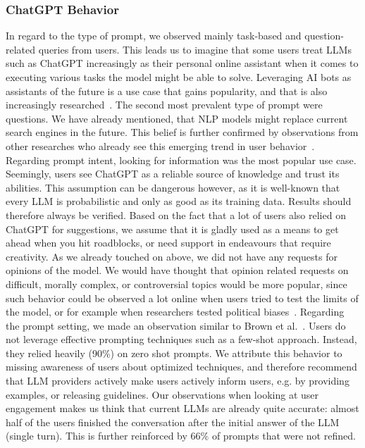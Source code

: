 \subsubsection{ChatGPT Behavior}
In regard to the type of prompt, we observed mainly task-based and question-related queries from
users.
This leads us to imagine that some users treat LLMs such as ChatGPT increasingly as their
personal online assistant when it comes to executing various tasks the model might be able to solve.
Leveraging AI bots as assistants of the future is a use case that gains popularity, and that is also
increasingly researched~\cite{eshghie_chatgpt_2023}.
The second most prevalent type of prompt were questions.
We have already mentioned, that NLP models might replace current search engines in the future.
This belief is further confirmed by observations from other researches who already see this
emerging trend in user behavior~\cite{van_bulck_what_2023}.
Regarding prompt intent, looking for information was the most popular use case.
Seemingly, users see ChatGPT as a reliable source of knowledge and trust its abilities.
This assumption can be dangerous however, as it is well-known that every LLM is probabilistic and
only as good as its training data.
Results should therefore always be verified.
Based on the fact that a lot of users also relied on ChatGPT for suggestions, we assume that it
is gladly used as a means to get ahead when you hit roadblocks, or need support in endeavours
that require creativity.
As we already touched on above, we did not have any requests for opinions of the model.
We would have thought that opinion related requests on difficult, morally complex, or
controversial topics would be more popular, since such behavior could be observed a lot online when
users tried to test the limits of the model, or for example when researchers tested political
biases~\cite{rozado_political_2023}.
Regarding the prompt setting, we made an observation similar to Brown et al.~\cite{
    brown_language_2020}.
Users do not leverage effective prompting techniques such as a few-shot approach.
Instead, they relied heavily (90\%) on zero shot prompts.
We attribute this behavior to missing awareness of users about optimized techniques, and
therefore recommend that LLM providers actively make users actively inform users, e.g. by
providing examples, or releasing guidelines.
Our observations when looking at user engagement makes us think that current LLMs are already
quite accurate: almost half of the users finished the conversation after the initial answer of
the LLM (single turn).
This is further reinforced by 66\% of prompts that were not refined.
